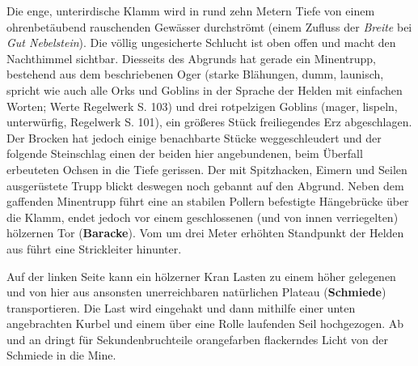 Die enge, unterirdische Klamm wird in rund zehn Metern Tiefe von einem ohrenbetäubend rauschenden Gewässer durchströmt (einem Zufluss der \textit{Breite} bei \textit{Gut Nebelstein}). Die völlig ungesicherte Schlucht ist oben offen und macht den Nachthimmel sichtbar. Diesseits des Abgrunds hat gerade ein Minentrupp, bestehend aus dem beschriebenen Oger (starke Blähungen, dumm, launisch, spricht wie auch alle Orks und Goblins in der Sprache der Helden mit einfachen Worten; Werte Regelwerk S. 103) und drei rotpelzigen Goblins (mager, lispeln, unterwürfig, Regelwerk S. 101), ein größeres Stück freiliegendes Erz abgeschlagen. Der Brocken hat jedoch einige benachbarte Stücke weggeschleudert und der folgende Steinschlag einen der beiden hier angebundenen, beim Überfall erbeuteten Ochsen in die Tiefe gerissen. Der mit Spitzhacken, Eimern und Seilen ausgerüstete Trupp blickt deswegen noch gebannt auf den Abgrund. Neben dem gaffenden Minentrupp führt eine an stabilen Pollern befestigte Hängebrücke über die Klamm, endet jedoch vor einem geschlossenen (und von innen verriegelten) hölzernen Tor (\textbf{Baracke}). Vom um drei Meter erhöhten Standpunkt der Helden aus führt eine Strickleiter hinunter.

Auf der linken Seite kann ein hölzerner Kran Lasten zu einem höher gelegenen und von hier aus ansonsten unerreichbaren natürlichen Plateau (\textbf{Schmiede}) transportieren. Die Last wird eingehakt und dann mithilfe einer unten angebrachten Kurbel und einem über eine Rolle laufenden Seil hochgezogen. Ab und an dringt für Sekundenbruchteile orangefarben flackerndes Licht von der Schmiede in die Mine.




